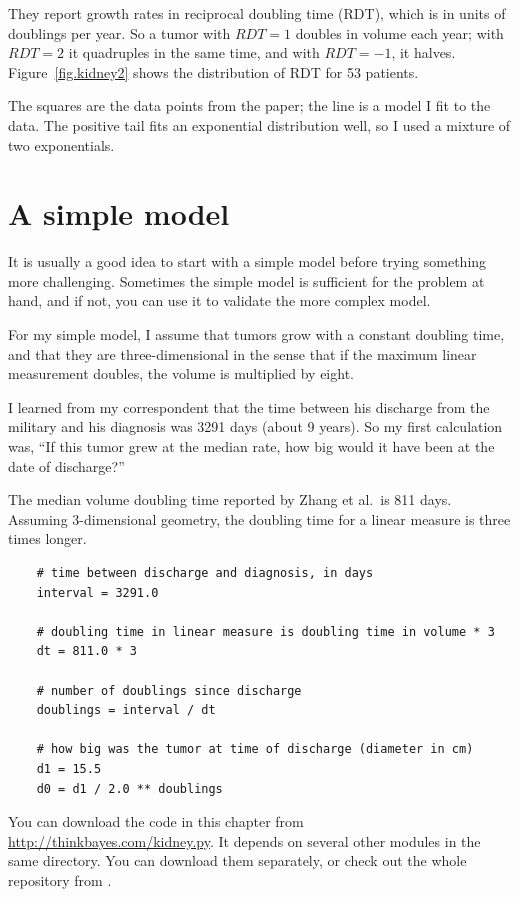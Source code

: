 \documentclass[12pt]{book}
\begin{document}
They report growth rates in reciprocal doubling time (RDT),
which is in units of doublings per year.  So a tumor with $RDT=1$
doubles in volume each year; with $RDT=2$ it quadruples in the same
time, and with $RDT=-1$, it halves.  Figure~\ref{fig.kidney2} shows the
distribution of RDT for 53 patients.

The squares are the data points from the paper; the line is a model I
fit to the data.  The positive tail fits an exponential distribution
well, so I used a mixture of two exponentials.


\section{A simple model}

It is usually a good idea to start with a simple model before
trying something more challenging.  Sometimes the simple model is
sufficient for the problem at hand, and if not, you can use it
to validate the more complex model.

For my simple model, I assume that tumors grow with a constant
doubling time, and that they are three-dimensional in the sense that
if the maximum linear measurement doubles, the volume is multiplied by
eight.

I learned from my correspondent that the time between his discharge
from the military and his diagnosis was 3291 days (about 9 years).
So my first calculation was, ``If this tumor grew at the median
rate, how big would it have been at the date of discharge?''

The median volume doubling time reported by Zhang et al.~is 811 days.
Assuming 3-dimensional geometry, the doubling time for a linear
measure is three times longer.

\begin{verbatim}
    # time between discharge and diagnosis, in days 
    interval = 3291.0

    # doubling time in linear measure is doubling time in volume * 3
    dt = 811.0 * 3

    # number of doublings since discharge
    doublings = interval / dt

    # how big was the tumor at time of discharge (diameter in cm)
    d1 = 15.5
    d0 = d1 / 2.0 ** doublings
\end{verbatim}

You can download the code in this chapter from
\url{http://thinkbayes.com/kidney.py}.  It depends on several other
modules in the same directory.  You can download them separately,
or check out the whole repository from \url{}.
\end{document}
